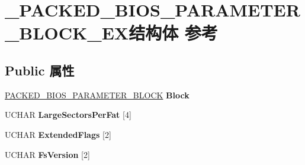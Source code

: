 \hypertarget{struct___p_a_c_k_e_d___b_i_o_s___p_a_r_a_m_e_t_e_r___b_l_o_c_k___e_x}{}\section{\+\_\+\+P\+A\+C\+K\+E\+D\+\_\+\+B\+I\+O\+S\+\_\+\+P\+A\+R\+A\+M\+E\+T\+E\+R\+\_\+\+B\+L\+O\+C\+K\+\_\+\+E\+X结构体 参考}
\label{struct___p_a_c_k_e_d___b_i_o_s___p_a_r_a_m_e_t_e_r___b_l_o_c_k___e_x}
\subsection*{Public 属性}
\begin{DoxyCompactItemize}
\item 
\mbox{\label{struct___p_a_c_k_e_d___b_i_o_s___p_a_r_a_m_e_t_e_r___b_l_o_c_k___e_x_ad26afed6e02d35ef0e1b044e9ff47204}} 
\hyperlink{struct___p_a_c_k_e_d___b_i_o_s___p_a_r_a_m_e_t_e_r___b_l_o_c_k}{P\+A\+C\+K\+E\+D\+\_\+\+B\+I\+O\+S\+\_\+\+P\+A\+R\+A\+M\+E\+T\+E\+R\+\_\+\+B\+L\+O\+CK} {\bfseries Block}
\item 
\mbox{\label{struct___p_a_c_k_e_d___b_i_o_s___p_a_r_a_m_e_t_e_r___b_l_o_c_k___e_x_a34b4030ca71044b05a5da836f5246dd3}} 
U\+C\+H\+AR {\bfseries Large\+Sectors\+Per\+Fat} \mbox{[}4\mbox{]}
\item 
\mbox{\label{struct___p_a_c_k_e_d___b_i_o_s___p_a_r_a_m_e_t_e_r___b_l_o_c_k___e_x_a40b83dd8b78f8666981adfc164e6537f}} 
U\+C\+H\+AR {\bfseries Extended\+Flags} \mbox{[}2\mbox{]}
\item 
\mbox{\label{struct___p_a_c_k_e_d___b_i_o_s___p_a_r_a_m_e_t_e_r___b_l_o_c_k___e_x_a5f34b92db951c2dd162b4437e8d13591}} 
U\+C\+H\+AR {\bfseries Fs\+Version} \mbox{[}2\mbox{]}
\item 
\mbox{\label{struct___p_a_c_k_e_d___b_i_o_s___p_a_r_a_m_e_t_e_r___b_l_o_c_k___e_x_a0b19236a8335bccc20d675e8567ee51a}} 

\end{DoxyCompactItemize}
